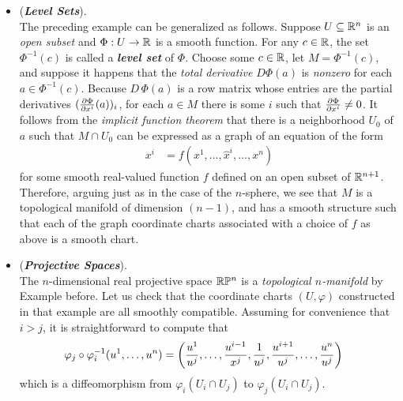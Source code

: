 \documentclass[11pt]{article}
\begin{document}
\begin{itemize}
\item \begin{example} (\emph{\textbf{Level Sets}}).\\
The preceding example can be generalized as follows. Suppose $U \subseteq {\mathbb R}^n$ is an \emph{open subset} and $\Phi: U \rightarrow {\mathbb R}$ is a smooth function. For any $c \in {\mathbb R}$, the set $\Phi^{-1}(c)$ is called a \emph{\textbf{level set}} of $\Phi$. Choose some $c \in {\mathbb R}$, let $M = \Phi^{-1}(c)$, and suppose it happens that the \emph{total derivative} $D\Phi(a)$ is \emph{nonzero} for each $a \in  \Phi^{-1}(c)$. Because $D\,\Phi(a)$ is a row matrix whose entries are the partial derivatives $(\frac{\partial \Phi}{ \partial x^{i}}(a))_i$, for each $a \in M$ there is some $i$ such that $\frac{\partial \Phi}{ \partial x^{i}} \neq 0$. It follows from the \emph{implicit function theorem} that there is a neighborhood $U_0$ of $a$ such that $M \cap U_0$ can be expressed as a graph of an equation of the form
\begin{align*}
x^{i} &= f(x^1,\ldots, \widehat{x}^{i},\ldots, x^{n})
\end{align*} for some smooth real-valued function $f$ defined on an open subset of ${\mathbb R}^{n+1}$. Therefore, arguing just as in the case of the $n$-sphere, we see that $M$ is a topological manifold of dimension $(n - 1)$, and has a smooth structure such that each of the graph coordinate charts associated with a choice of $f$ as above is a smooth chart.
\end{example}

\item \begin{example} (\emph{\textbf{Projective Spaces}}).\\
The $n$-dimensional real projective space ${\mathbb R}{\mathbb P}^n$ is a \emph{topological $n$-manifold} by Example before. Let us check that the coordinate charts $(U, \varphi)$ constructed in that example are all smoothly compatible. Assuming for convenience that $i > j$, it is straightforward to compute that
\begin{align*}
\varphi_{j} \circ \varphi_{i}^{-1}(u^1,\ldots, u^{n}) &=\left(\frac{u^1}{u^{j}}, \ldots, \frac{u^{i-1}}{x^{j}}, \frac{1}{u^{j}},  \frac{u^{i+1}}{u^{j}},\ldots, \frac{u^{n}}{u^{j}}\right)
\end{align*} which is a diffeomorphism from $\varphi_i(U_i \cap U_j)$ to $\varphi_{j}(U_i \cap U_j)$.
\end{example}


\end{itemize}
\end{document}
